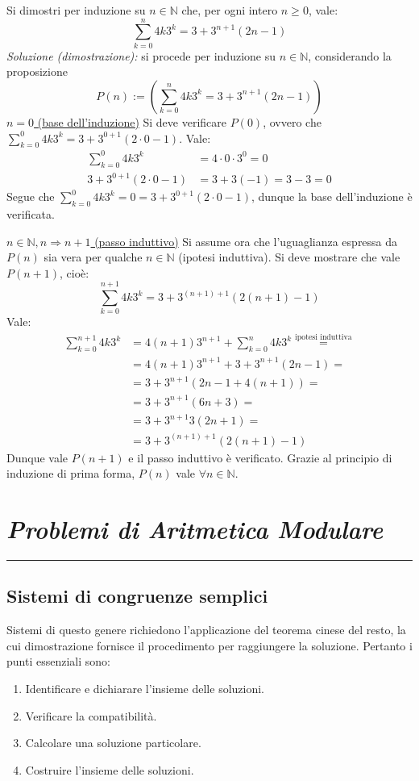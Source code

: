 \documentclass[oneside]{book}
\newcommand{\chptr}[1]{\chapter{\textit{#1}}\noindent\rule{\textwidth}{1pt}}
\theoremstyle{remark}
\begin{document}
\begin{tcolorbox}[enhanced, breakable, colback=blue!30, colframe=blue!30!black, title=Esempio]
Si dimostri per induzione su $n\in\mathbb{N}$ che, per ogni intero $n\geq0$,
vale: \[ \sum_{k=0}^{n}4k3^k=3+3^{n+1}(2n-1) \]
\textit{Soluzione (dimostrazione):} si procede per induzione su $n\in\mathbb{N}$,
considerando la proposizione \[P(n):=\left( \sum_{k=0}^{n}4k3^k=3+3^{n+1}(2n-1) \right)\]
\underline{$n=0$ (base dell'induzione)} Si deve verificare $P(0)$,
ovvero che $\sum_{k=0}^{0}4k3^k=3+3^{0+1}(2\cdot0-1)$.
Vale:
\begin{align*}
\sum_{k=0}^{0}4k3^k  &=4\cdot0\cdot3^0=0\\
3+3^{0+1}(2\cdot0-1) &=3+3(-1)=3-3=0
\end{align*}
Segue che $\sum_{k=0}^{0}4k3^k=0=3+3^{0+1}(2\cdot0-1)$, dunque la base
dell'induzione è verificata.

\underline{$n\in\mathbb{N},n\Longrightarrow n+1$ (passo induttivo)}
Si assume ora che l'uguaglianza espressa da $P(n)$ sia vera per
qualche $n\in\mathbb{N}$ (ipotesi induttiva). Si deve mostrare che
vale $P(n+1)$, cioè:
\[ \sum_{k=0}^{n+1}4k3^k=3+3^{(n+1)+1}(2(n+1)-1) \]
Vale:
\begin{align*}
\sum_{k=0}^{n+1}4k3^k &=4(n+1)3^{n+1} + \sum_{k=0}^{n}4k3^k \stackrel{\text{ipotesi induttiva}}{=}\\
                        &=4(n+1)3^{n+1} + 3+3^{n+1}(2n-1) =\\
                        &=3+3^{n+1}(2n-1+4(n+1)) =\\
                        &=3+3^{n+1}(6n+3) =\\
                        &=3+3^{n+1}3(2n+1) =\\
                        &=3+3^{(n+1)+1}(2(n+1)-1)
\end{align*}
Dunque vale $P(n+1)$ e il passo induttivo è verificato. Grazie al
principio di induzione di prima forma, $P(n)$ vale $\forall n\in\mathbb{N}$.
\end{tcolorbox}



\chptr{Problemi di Aritmetica Modulare}

\section{Sistemi di congruenze semplici}
Sistemi di questo genere richiedono l'applicazione del teorema cinese
del resto, la cui dimostrazione fornisce il procedimento per raggiungere la
soluzione. Pertanto i punti essenziali sono:
\begin{enumerate}
\item Identificare e dichiarare l'insieme delle soluzioni.
\item Verificare la compatibilità.
\item Calcolare una soluzione particolare.
\item Costruire l'insieme delle soluzioni.
\end{enumerate}
\end{document}
